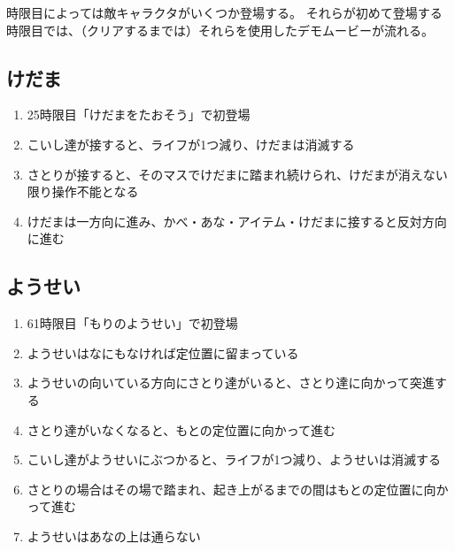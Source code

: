 \clearpage
時限目によっては敵キャラクタがいくつか登場する。
それらが初めて登場する時限目では、（クリアするまでは）それらを使用したデモムービーが流れる。


\subsection{けだま}
\begin{enumerate}[label={\sarrow}]
\item 25時限目「けだまをたおそう」で初登場
\item こいし達が接すると、ライフが1つ減り、けだまは消滅する
\item さとりが接すると、そのマスでけだまに踏まれ続けられ、けだまが消えない限り操作不能となる
\item けだまは一方向に進み、かべ・あな・アイテム・けだまに接すると反対方向に進む
\end{enumerate}


\subsection{ようせい}
\begin{enumerate}[label={\sarrow}]
\item 61時限目「もりのようせい」で初登場
\item ようせいはなにもなければ定位置に留まっている
\item ようせいの向いている方向にさとり達がいると、さとり達に向かって突進する
\item さとり達がいなくなると、もとの定位置に向かって進む
\item こいし達がようせいにぶつかると、ライフが1つ減り、ようせいは消滅する
\item さとりの場合はその場で踏まれ、起き上がるまでの間はもとの定位置に向かって進む
\item ようせいはあなの上は通らない
\end{enumerate}


